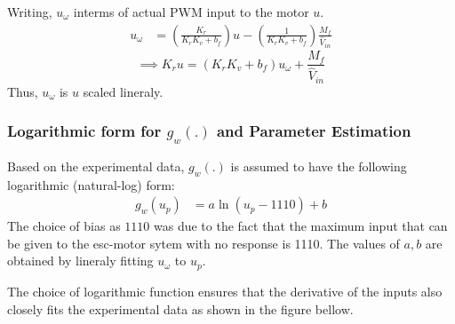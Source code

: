Writing, $u_{\omega}$ interms of actual PWM input to the motor $u$.
\begin{align*}
    u_{\omega} &= \left(\frac{K_r}{K_r K_v  + b_f} \right) u - \left(\frac{1}{K_r K_v  + b_f} \right) \frac{M_f}{\hat V_{in}}
\end{align*}
\begin{equation}
    \implies K_r u = (K_r K_v  + b_f) u_\omega + \frac{M_f}{\hat V_{in}}
    \label{eqn:norm_in}
\end{equation}
Thus, $u_{\omega}$ is $u$ scaled lineraly.

\subsubsection{Logarithmic form for $g_w(.)$ and Parameter Estimation}

Based on the experimental data, $g_w(.)$ is assumed to have the following logarithmic (natural-log) form:
\begin{align*}
    g_w(u_p) &= a \ln(u_p - 1110) + b
\end{align*}
The choice of bias as $1110$ was due to the fact that the maximum input that can be given to the esc-motor sytem with no response is 1110. The values of $a, b$ are obtained by lineraly fitting $u_\omega$ to $u_p$.

The choice of logarithmic function ensures that the derivative of the inputs also closely fits the experimental data as shown in the figure bellow.

